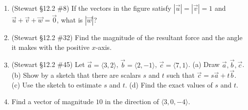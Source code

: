 \documentclass[12pt]{article}
\begin{document}
\begin{enumerate}
\begin{enumerate}
        \item (Stewart \S12.2 \#8) If the vectors in the figure satisfy $|\vec{u}|=|\vec{v}|=1$ and $\vec{u}+\vec{v}+\vec{w}=\vec{0}$, what is $|\vec{w}|$?
        \begin{center}
        \end{center}

        \item (Stewart \S12.2 \#32) Find the magnitude of the resultant force and the angle it makes with the positive $x$-axis.
        \begin{center}
        \end{center}

        \item (Stewart \S12.2 \#45) Let $\vec{a}=\langle 3,2\rangle$, $\vec{b}=\langle 2,-1\rangle$, $\vec{c}=\langle 7,1\rangle$.
        (a) Draw $\vec{a},\vec{b},\vec{c}$.
        (b) Show by a sketch that there are scalars $s$ and $t$ such that $\vec{c} = s\vec{a} + t\vec{b}$.
        (c) Use the sketch to estimate $s$ and $t$.
        (d) Find the exact values of $s$ and $t$.
        \item Find a vector of magnitude $10$ in the direction of $\langle 3,0,-4\rangle$.
    \end{enumerate}
\newpage


\end{enumerate}
\end{document}
